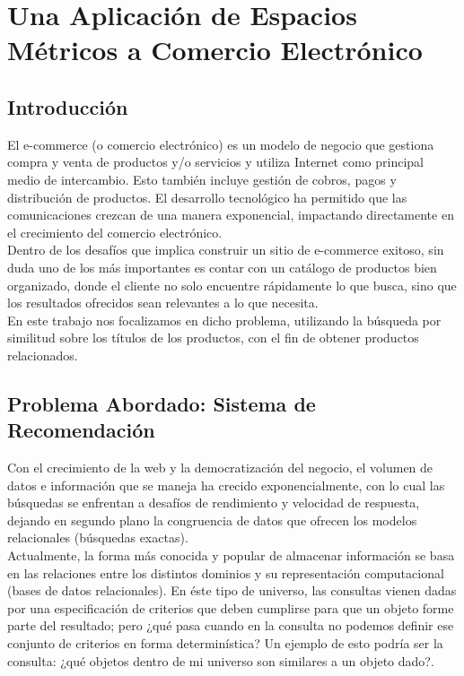 \chapter{Una Aplicaci\'on de Espacios M\'etricos a Comercio Electr\'onico}

\section{Introducci\'on}

El e-commerce (o comercio electr\'onico) es un modelo de negocio que gestiona compra y venta de productos y/o servicios  y utiliza Internet como principal medio de intercambio. Esto tambi\'en incluye gesti\'on de cobros, pagos y distribuci\'on de productos. El desarrollo tecnol\'ogico ha permitido que las comunicaciones crezcan de una manera exponencial, impactando directamente en el crecimiento del comercio electr\'onico.\\

Dentro de los desaf\'ios que implica construir un sitio de e-commerce exitoso, sin duda uno de los m\'as importantes es contar con un cat\'alogo de productos bien organizado, donde el cliente no solo encuentre r\'apidamente lo que busca, sino que los resultados ofrecidos sean relevantes a lo que necesita.\\

En este trabajo nos focalizamos en dicho problema, utilizando la b\'usqueda por similitud sobre los t\'itulos de los productos, con el fin de obtener productos relacionados.

\section{Problema Abordado: Sistema de Recomendaci\'on}

Con el crecimiento de la web y la democratizaci\'on del negocio, el volumen de datos e informaci\'on que se maneja ha crecido exponencialmente, con lo cual las b\'usquedas se enfrentan a desaf\'ios de rendimiento y velocidad de respuesta, dejando en segundo plano la congruencia de datos que ofrecen los modelos relacionales (b\'usquedas exactas).\\

Actualmente, la forma m\'as conocida y popular de almacenar informaci\'on se basa en las relaciones entre los distintos dominios y su representaci\'on computacional (bases de datos relacionales). En \'este tipo de universo, las consultas vienen dadas por una especificaci\'on de criterios que deben cumplirse para que un objeto forme parte del resultado; pero ¿qu\'e pasa cuando en la consulta no podemos definir ese conjunto de criterios en forma determin\'istica? Un ejemplo de esto podr\'ia ser la consulta: ¿qu\'e objetos dentro de mi universo son similares a un objeto dado?.\\

